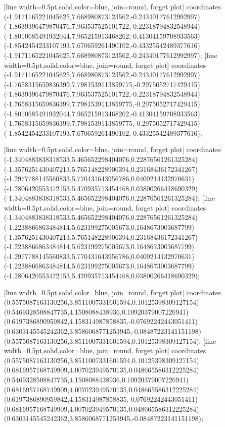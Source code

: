 [line width=0.5pt,solid,color=blue, join=round, forget plot] coordinates {(-1.9171165221045625,7.668980873123562,-0.24340177612992997) (-1.8639396479870476,7.963537525101722,-0.22318794832548944) (-1.8010685491932044,7.965215913468262,-0.41304159708933563) (-1.8542454233107193,7.670659261490102,-0.43325542489377616) (-1.9171165221045625,7.668980873123562,-0.24340177612992997)};
[line width=0.5pt,solid,color=blue, join=round, forget plot] coordinates {(-1.9171165221045625,7.668980873123562,-0.24340177612992997) (-1.7658315659836399,7.7981539113859775,-0.2975052717429415) (-1.8639396479870476,7.963537525101722,-0.22318794832548944) (-1.7658315659836399,7.7981539113859775,-0.2975052717429415) (-1.8010685491932044,7.965215913468262,-0.41304159708933563) (-1.7658315659836399,7.7981539113859775,-0.2975052717429415) (-1.8542454233107193,7.670659261490102,-0.43325542489377616)};

[line width=0.5pt,solid,color=blue, join=round, forget plot] coordinates {(-1.3404883838318533,5.465652298404076,0.22876561261325284) (-1.3576251430407213,5.765148228906394,0.23168436172341267) (-1.2977788145560833,5.770431643956786,0.0409214132970631) (-1.2806420553472153,5.470935713454468,0.03800266418690329) (-1.3404883838318533,5.465652298404076,0.22876561261325284)};
[line width=0.5pt,solid,color=blue, join=round, forget plot] coordinates {(-1.3404883838318533,5.465652298404076,0.22876561261325284) (-1.2238866863484814,5.623199275005673,0.1648673003687799) (-1.3576251430407213,5.765148228906394,0.23168436172341267) (-1.2238866863484814,5.623199275005673,0.1648673003687799) (-1.2977788145560833,5.770431643956786,0.0409214132970631) (-1.2238866863484814,5.623199275005673,0.1648673003687799) (-1.2806420553472153,5.470935713454468,0.03800266418690329)};

[line width=0.5pt,solid,color=blue, join=round, forget plot] coordinates {(0.5575087163130256,3.8511007331601594,0.10125398309127154) (0.5469328508847735,4.1508088438936,0.10920379007226941) (0.6197386890959842,4.158314987858835,-0.07692242443051411) (0.6303145545242362,3.8586068771253945,-0.08487223141151198) (0.5575087163130256,3.8511007331601594,0.10125398309127154)};
[line width=0.5pt,solid,color=blue, join=round, forget plot] coordinates {(0.5575087163130256,3.8511007331601594,0.10125398309127154) (0.6816957168749909,4.007023949570135,0.048665586312225284) (0.5469328508847735,4.1508088438936,0.10920379007226941) (0.6816957168749909,4.007023949570135,0.048665586312225284) (0.6197386890959842,4.158314987858835,-0.07692242443051411) (0.6816957168749909,4.007023949570135,0.048665586312225284) (0.6303145545242362,3.8586068771253945,-0.08487223141151198)};

